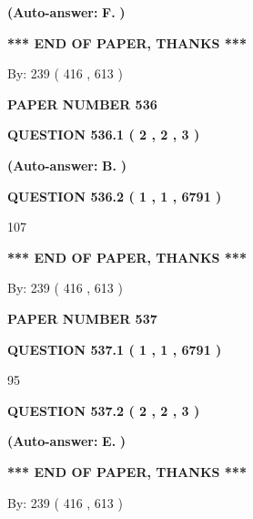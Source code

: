 \documentclass[12pt]{article}
\begin{document}
 
{\textbf{(Auto-answer:}}
{\textbf{\large{
F.}}}
{\textbf{)}}
 
 
   
   
   
   
\vspace{1.0in} 
{\textbf{\large{ *** END OF PAPER, THANKS *** }}} 
   
   
\hspace{1.0in} By: 
 239 ( 416 ,  613 )
   
   
   
   
\newpage 
\setcounter{page}{ 
   536001 } 
   
   
 {\textbf{ \Large{ PAPER NUMBER  536  }}}
   
   
   
   
  
  
{\textbf{\large{QUESTION
536.1 
 ( 2 , 2 , 3 )
}}}
 
 
{\textbf{(Auto-answer:}}
{\textbf{\large{
B.}}}
{\textbf{)}}
 
 
  
  
{\textbf{\large{QUESTION
536.2 
 ( 1 , 1 , 6791 )
}}}

107
   
   
   
   
\vspace{1.0in} 
{\textbf{\large{ *** END OF PAPER, THANKS *** }}} 
   
   
\hspace{1.0in} By: 
 239 ( 416 ,  613 )
   
   
   
   
\newpage 
\setcounter{page}{ 
   537001 } 
   
   
 {\textbf{ \Large{ PAPER NUMBER  537  }}}
   
   
   
   
  
  
{\textbf{\large{QUESTION
537.1 
 ( 1 , 1 , 6791 )
}}}

95
  
  
{\textbf{\large{QUESTION
537.2 
 ( 2 , 2 , 3 )
}}}
 
 
{\textbf{(Auto-answer:}}
{\textbf{\large{
E.}}}
{\textbf{)}}
 
 
   
   
   
   
\vspace{1.0in} 
{\textbf{\large{ *** END OF PAPER, THANKS *** }}} 
   
   
\hspace{1.0in} By: 
 239 ( 416 ,  613 )
   
   
   
\end{document}
